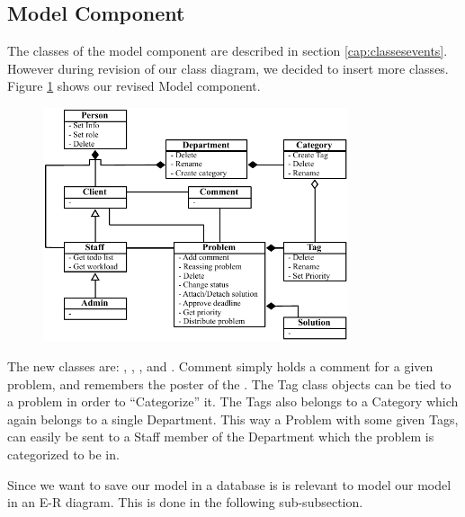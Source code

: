 \subsection{Model Component}
\label{sub:modelComponent}
The classes of the model component are described in section \ref{cap:classesevents}.
However during revision of our class diagram, we decided to insert more classes.
Figure \ref{fig:modelComponent} shows our revised Model component.

\begin{figure}[hbt]
	\centering
		\includegraphics[width=0.80\textwidth]{input/component_design/Modelcomponent.pdf}
	\label{fig:modelComponent}
\end{figure}

The new classes are: , , , and .
Comment simply holds a comment for a given problem, and remembers the poster of the .
The Tag class objects can be tied to a problem in order to ``Categorize'' it.
The Tags also belongs to a Category which again belongs to a single Department.
This way a Problem with some given Tags, can easily be sent to a Staff member of the Department which the problem is categorized to be in.

Since we want to save our model in a database is is relevant to model our model in an E-R diagram.
This is done in the following sub-subsection.
